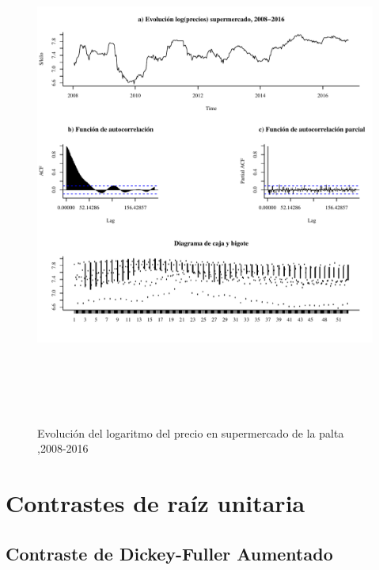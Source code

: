 \documentclass[12pt, twoside]{book}\usepackage[]{graphicx}\usepackage[]{color}
\newenvironment{knitrout}{}{} %
\numberwithin{equation}{section}
\numberwithin{theorem}{section}
\numberwithin{teorema}{section}
\numberwithin{defi}{section}
\numberwithin{prop}{section}
\numberwithin{defi}{section}
\theoremstyle{plain}
\begin{document}
\begin{knitrout}
\color{fgcolor}\begin{figure}[H]

{\centering \includegraphics[width=6in,height=6.5in]{figure/fig-2_2-1} 

}

\caption[Evolución del logaritmo del precio en supermercado de la palta ,2008-2016]{Evolución del logaritmo del precio en supermercado de la palta ,2008-2016}\label{fig:fig-2.2}
\end{figure}


\end{knitrout}

\section{Contrastes de raíz unitaria}
\subsection{Contraste de Dickey-Fuller Aumentado}
\end{document}

